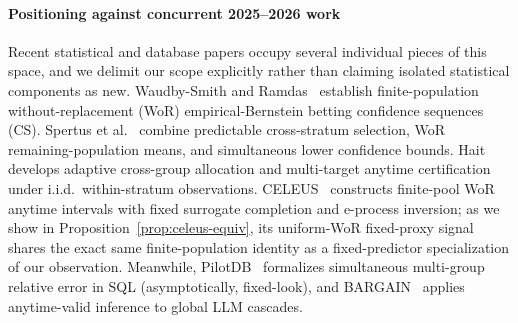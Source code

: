 \paragraph{Positioning against concurrent 2025--2026 work}
Recent statistical and database papers occupy several individual pieces of this space, and we delimit our scope explicitly rather than claiming isolated statistical components as new.
Waudby-Smith and Ramdas~\cite{wor2020,waudby2024betting} establish finite-population without-replacement (WoR) empirical-Bernstein betting confidence sequences (CS).
Spertus et al.~\cite{spertus2026sequential} combine predictable cross-stratum selection, WoR remaining-population means, and simultaneous lower confidence bounds.
Hait~\cite{hait2026target} develops adaptive cross-group allocation and multi-target anytime certification under i.i.d.\ within-stratum observations.
CELEUS~\cite{zhou2026celeus} constructs finite-pool WoR anytime intervals with fixed surrogate completion and e-process inversion; as we show in Proposition~\ref{prop:celeus-equiv}, its uniform-WoR fixed-proxy signal shares the exact same finite-population identity as a fixed-predictor specialization of our observation.
Meanwhile, PilotDB~\cite{zhu2025pilotdb} formalizes simultaneous multi-group relative error in SQL (asymptotically, fixed-look), and BARGAIN~\cite{zeighami2026bargain} applies anytime-valid inference to global LLM cascades.

